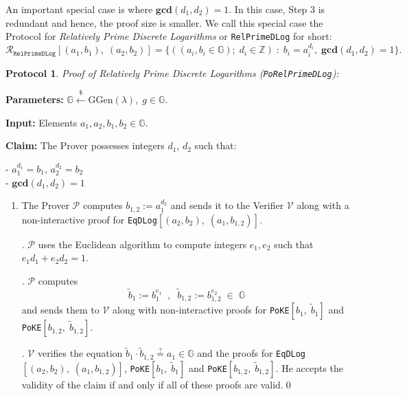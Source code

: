 \documentclass[11pt, lettersize, notitlepage, leqno, footskip=0.6cm]{article}
\newcommand{\bz}{\mathbb Z}
\newcommand{\ttt}{\texttt}
\newcommand{\bG}{\mathbb{G}}
\newcommand{\wti}{\widetilde}
\newcommand{\mc}{\mathcal}
\newcommand{\mb}{\mathbb}
\newcommand{\mbf}{\mathbf}
\newcommand{\mr}{\mathrm}
\newcommand{\lamb}{\lambda}
\newcommand{\V}{\mc{V}}
\newcommand{\vs}{\vspace{-0.15cm}}
\newcommand{\noin}{\noindent}
\newcommand{\GCD}{\mbf{gcd}}
\newtheorem{Prot}[Thm]{Protocol}
\numberwithin{equation}{section}
\begin{document}
\noindent An important special case is where $\GCD(d_1, d_2) = 1$. In this case, Step 3 is redundant and hence, the proof size is smaller. We call this special case the Protocol for \textit{Relatively Prime Discrete Logarithms} or \verb|RelPrimeDLog| for short: \[\mc{R}_{{\ttt{RelPrimeDLog}}}[(a_1,b_1),\;(a_2,b_2)] = \big\{((a_i, b_i\in\mb{G});\;d_i\in\bz)\;:\; b_i = a_i^{d_i},\;\GCD(d_1,d_2)=1 \big\} .\] 



\begin{Prot} \normalfont \hypertarget{RP}{\textit{Proof of Relatively Prime Discrete Logarithms}} (\verb|PoRelPrimeDLog|):\end{Prot} \vspace{-0.3cm}

\noindent \textbf{Parameters:} $\mb{G}\xleftarrow{\$} \mr{GGen}(\lamb), \; g\in \mb{G}$.

\noindent \textbf{Input:} Elements $a_1, a_2, b_1, b_2 \in \mb{G}$. 

\noindent \textbf{Claim:} The Prover possesses integers $d_1$, $d_2$ such that:

\noindent - $a_1^{d_1} = b_1$, $a_2^{d_2} = b_2$\\
\noindent - $\GCD(d_1, d_2) = 1$
 

\begin{enumerate}[wide, labelwidth=!, labelindent=0pt]\vs \item The Prover $\mc{P}$ computes $b_{1,2}:= a_1^{d_2}$ and sends it to the Verifier $\V$ along with a non-interactive proof for \verb|EqDLog|$[(a_2, b_2),\; (a_1, b_{1,2})]$.

. $\mc{P}$ uses the Euclidean algorithm to compute integers $e_1, e_2$ such that $e_1d_1 + e_2d_2 = 1$.

\noin 3. $\mc{P}$ computes \vs $$\wti{b}_1:= b_1^{e_1}\;\;,\;\; \wti{b}_{1,2}:= b_{1,2}^{e_2}\;\in\;\bG $$ and sends them to $\V$ along with non-interactive proofs for \verb|PoKE|$[b_1,\; \wti{b}_1]$ and \verb|PoKE|$[b_{1,2},\; \wti{b}_{1,2}]$.

\noin 4. $\mc{V}$ verifies the equation $\wti{b}_1\cdot\wti{b}_{1,2}\stackrel{?}{=} a_1\in\bG $ and the proofs for \verb|EqDLog|$[(a_2, b_2),\; (a_1, b_{1,2})]$, \verb|PoKE|$[b_1,\; \wti{b}_1]$ and \verb|PoKE|$[b_{1,2},\; \wti{b}_{1,2}]$. He accepts the validity of the claim if and only if all of these proofs are valid.\qed \end{enumerate}

\vspace{0.1cm}
\end{document}
